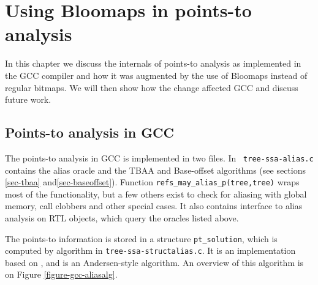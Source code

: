 \chapter{Using Bloomaps in points-to analysis}

In this chapter we discuss the internals of points-to analysis as
implemented in the GCC compiler and how it was augmented by the use of Bloomaps
instead of regular bitmaps. We will then show how the change affected GCC and
discuss future work.

\section{Points-to analysis in GCC}

The points-to analysis in GCC is implemented in two files. In {\tt
tree-ssa-alias.c} contains the alias oracle and the TBAA and Base-offset
algorithms (see sections \ref{sec-tbaa} and\ref{sec-baseoffset}).
Function {\tt refs\_may\_alias\_p(tree,tree)} wraps most of the functionality,
but a few others exist to check for aliasing with global memory, call clobbers
and other special cases. It also contains interface to alias analysis on RTL
objects, which query the oracles listed above.

The points-to information is stored in a structure {\tt pt\_solution}, which is
computed by algorithm in {\tt tree-ssa-structalias.c}. It is an implementation
based on \cite{Pearce2004,Heintze2001}, and is an Andersen-style algorithm. An
overview of this algorithm is on Figure \ref{figure-gcc-aliasalg}.


